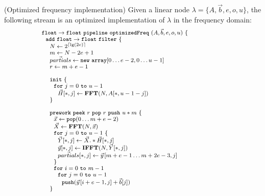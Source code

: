 \documentclass{sig-alternate}
\begin{document}
{\begin{transformation}
(Optimized frequency implementation)
Given a linear node $\lambda = \{A, {\vec b}, e, o, u\}$, the
following stream is an optimized implementation of $\lambda$ in the
frequency domain:
\begin{equation} \nonumber
{\small
  \begin{array}{ll}
    {\tt float \rightarrow float}~{\tt pipeline~optimizedFreq~}(A, {\vec b}, e, o, u){\tt ~\{} & \hspace{40pt}\\
    ~~{\tt add~float \rightarrow float~filter~\{}\\
    ~~~~N \leftarrow 2^{\lceil \lg(2e) \rceil} \\
    ~~~~m \leftarrow N-2e+1 \\
    ~~~~\vec{partials} \leftarrow {\tt new~array}[0 \dots e-2, 0\dots u-1] \\
    ~~~~r \leftarrow m+e-1 \\
    \\
    ~~~~{\tt init}~{\tt \{} \\
    ~~~~~~{\tt for}~j=0~{\tt to}~u-1\\
    ~~~~~~~~\vec{H}[*,j] \leftarrow \mathbf{FFT}(N,A[*,u-1-j]) \\
    ~~~~{\tt \}} \\
    \\
    ~~~~{\tt prework}~{\tt peek}~r~{\tt pop}~r~{\tt push}~u*m~{\tt \{}\\
    ~~~~~~\vec{x} \leftarrow {\tt pop}(0 \dots m+e-2) \\
    ~~~~~~\vec{X} \leftarrow \mathbf{FFT} (N, \vec{x}) \\
    ~~~~~~{\tt for}~j=0~{\tt to}~u-1~{\tt \{}\\
    ~~~~~~~~\vec{Y}[*,j] \leftarrow \vec{X} .* \vec{H}[*,j] \\
    ~~~~~~~~\vec{y}[*,j] \leftarrow \mathbf{IFFT}(N, \vec{Y}[*,j]) \\
    ~~~~~~~~\vec{partials}[*,j] \leftarrow \vec{y}\hspace{1pt}[m+e-1 \dots m+2e-3,j] \\
    ~~~~~~{\tt \}} \\
    ~~~~~~{\tt for}~i=0~{\tt to}~m-1\\
    ~~~~~~~~{\tt for}~j=0~{\tt to}~u-1\\
    ~~~~~~~~~~{\tt push}(\vec{y}\hspace{1pt}[i+e-1,j] + \vec{b}[j]) \\
    ~~~~{\tt \}} \\

\end{array}}
\end{equation}
\end{transformation}}
\end{document}
